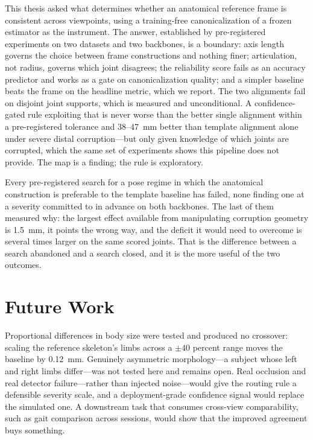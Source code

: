 \documentclass[12pt,a4paper]{report}
\begin{document}
This thesis asked what determines whether an anatomical reference frame is consistent across viewpoints, using a training-free canonicalization of a frozen estimator as the instrument. The answer, established by pre-registered experiments on two datasets and two backbones, is a boundary: axis length governs the choice between frame constructions and nothing finer; articulation, not radius, governs which joint disagrees; the reliability score fails as an accuracy predictor and works as a gate on canonicalization quality; and a simpler baseline beats the frame on the headline metric, which we report. The two alignments fail on disjoint joint supports, which is measured and unconditional. A confidence-gated rule exploiting that is never worse than the better single alignment within a pre-registered tolerance and 38--47~mm better than template alignment alone under severe distal corruption---but only given knowledge of which joints are corrupted, which the same set of experiments shows this pipeline does not provide. The map is a finding; the rule is exploratory.

Every pre-registered search for a pose regime in which the anatomical construction is preferable to the template baseline has failed, none finding one at a severity committed to in advance on both backbones. The last of them measured why: the largest effect available from manipulating corruption geometry is 1.5~mm, it points the wrong way, and the deficit it would need to overcome is several times larger on the same scored joints. That is the difference between a search abandoned and a search closed, and it is the more useful of the two outcomes.

\section{Future Work}

Proportional differences in body size were tested and produced no crossover: scaling the reference skeleton's limbs across a $\pm 40$ percent range moves the baseline by 0.12~mm. Genuinely asymmetric morphology---a subject whose left and right limbs differ---was not tested here and remains open. Real occlusion and real detector failure---rather than injected noise---would give the routing rule a defensible severity scale, and a deployment-grade confidence signal would replace the simulated one. A downstream task that consumes cross-view comparability, such as gait comparison across sessions, would show that the improved agreement buys something.
\end{document}
